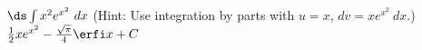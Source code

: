 {$\ds \int x^2e^{x^2}\ dx$ (Hint: Use integration by parts with $u=x$, $dv=xe^{x^2}\ dx$.)}
{$\frac{1}{2}x e^{x^2} - \frac{\sqrt{\pi}}{4}\erfi x +C$
}

